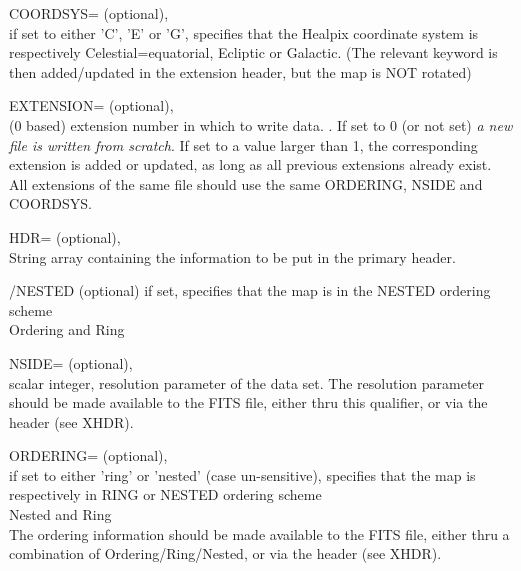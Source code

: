 \begin{keywords}
  \begin{kwlist}{} %
       \item[{COORDSYS=}] 
		  (optional), \\
		if set to either 'C', 'E' or 'G',  specifies that the
		Healpix coordinate system is respectively Celestial=equatorial,
		  Ecliptic or Galactic.
		(The relevant keyword is then added/updated in the extension
		  header, but the map is NOT rotated)

	\item[{EXTENSION=}] 
		  (optional), \\
	  (0 based) extension number in which to write data. .
	  If set to 0 (or not set) {\em a new file is written from scratch}.
	  If set to a value
		  larger than 1, the corresponding extension is added or
		  updated, as long as all previous extensions already exist.
		  All extensions of the same file should use the same ORDERING,
		  NSIDE and COORDSYS.

    	\item[HDR=] %
		(optional), \\
		String array containing the information to be put in
		the primary header. 

	\item[{/NESTED}]%
	(optional)
         if set, specifies that the map is in the NESTED ordering
	scheme\\
	\seealso Ordering and Ring 

	\item[{NSIDE=}]  
		(optional), \\
		scalar integer, \healpix resolution parameter of the
		data set. The resolution parameter should be made
		available to the FITS file, either thru this
		qualifier, or via the header (see XHDR).

	\item[{ORDERING=}] 
		  (optional), \\
		if set to either 'ring' or 'nested' (case un-sensitive),
		  specifies that the map is respectively in RING or NESTED
		  ordering scheme\\
		\seealso Nested and Ring \\
	The ordering information should be made
		available to the FITS file, either thru a combination
		  of Ordering/Ring/Nested, or via the header (see XHDR).


\end{kwlist}
\end{keywords}
